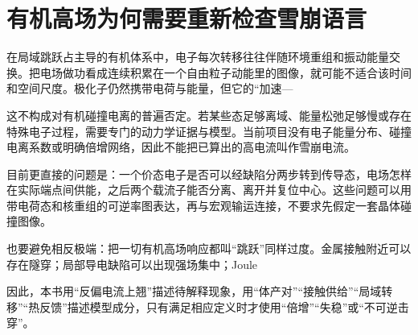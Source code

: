 \section{{\cjkfont 有机高场为何需要重新检查雪崩语言}\allowbreak{}}\label{sec:5}
{\cjkfont 在局域跳跃占主导的有机体系中，电子每次转移往往伴随环境重组和振动能量交换。把电场做功看成连续积累在一个自由粒子动能里的图像，就可能不适合该时间和空间尺度。极化子仍然携带电荷与能量，但它的“加速}\allowbreak{}—\allowbreak{}
\par
{\cjkfont 这不构成对有机碰撞电离的普遍否定。若某些态足够离域、能量松弛足够慢或存在特殊电子过程，需要专门的动力学证据与模型。当前项目没有电子能量分布、碰撞电离系数或明确倍增网络，因此不能把已算出的高电流叫作雪崩电流。}\allowbreak{}
\par
{\cjkfont 目前更直接的问题是：一个价态电子是否可以经缺陷分两步转到传导态，电场怎样在实际端点间供能，之后两个载流子能否分离、离开并复位中心。这些问题可以用带电荷态和核重组的可逆率图表达，再与宏观输运连接，不要求先假定一套晶体碰撞图像。}\allowbreak{}
\par
{\cjkfont 也要避免相反极端：把一切有机高场响应都叫“跳跃”同样过度。金属接触附近可以存在隧穿；局部导电缺陷可以出现强场集中；}\allowbreak{}Joule\allowbreak{}
\par
{\cjkfont 因此，本书用“反偏电流上翘”描述待解释现象，用“体产对”“接触供给”“局域转移”“热反馈”描述模型成分，只有满足相应定义时才使用“倍增”“失稳”或“不可逆击穿”。}\allowbreak{}
\par
{}
\medskip
\FloatBarrier
\Needspace{110pt}
